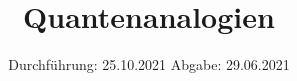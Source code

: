
\setlength\parindent{0pt}
\subject{V23}
\title{Quantenanalogien}
\date{%
  Durchführung: 25.10.2021
  \hspace{3em}
  Abgabe: 29.06.2021 \\
}



\maketitle
\thispagestyle{empty}
\tableofcontents
\newpage






\newpage
\nocite{*}
\printbibliography


